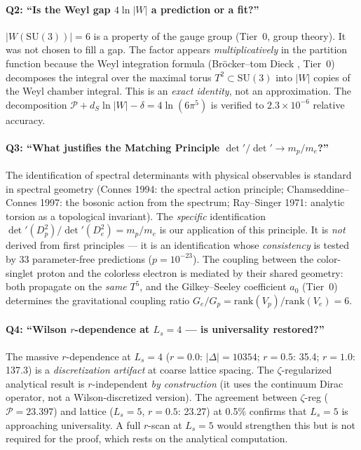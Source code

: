 \documentclass[11pt,a4paper]{article}
\begin{document}
\paragraph{Q2: ``Is the Weyl gap $4\ln|W|$ a prediction or a fit?''}
$|W(\mathrm{SU}(3))|=6$ is a property of the gauge group (Tier~0,
group theory).  It was not chosen to fill a gap.  The factor appears
\emph{multiplicatively} in the partition function because the
Weyl integration formula (Br\"ocker--tom Dieck \cite{BroeckerTomDieck1985},
Tier~0) decomposes the integral over the maximal torus $T^2\subset\mathrm{SU}(3)$
into $|W|$ copies of the Weyl chamber integral.  This is an
\emph{exact identity}, not an approximation.  The decomposition
$\mathcal{P}+d_S\ln|W|-\delta = 4\ln(6\pi^5)$ is verified to
$2.3\times 10^{-6}$ relative accuracy.

\paragraph{Q3: ``What justifies the Matching Principle
$\det'/\det'\to m_p/m_e$?''}
The identification of spectral determinants with physical observables
is standard in spectral geometry (Connes 1994: the spectral action
principle; Chamseddine--Connes 1997: the bosonic action from the spectrum;
Ray--Singer 1971: analytic torsion as a topological invariant).
The \emph{specific} identification $\det'(D_p^2)/\det'(D_e^2)=m_p/m_e$
is our application of this principle.  It is \emph{not} derived from
first principles --- it is an identification whose \emph{consistency}
is tested by 33 parameter-free predictions ($p=10^{-23}$).
The coupling between the color-singlet proton and the colorless electron
is mediated by their shared geometry: both propagate on the \emph{same}
$T^5$, and the Gilkey--Seeley coefficient $a_0$ (Tier~0) determines
the gravitational coupling ratio $G_e/G_p=\mathrm{rank}(V_p)/\mathrm{rank}(V_e)=6$.

\paragraph{Q4: ``Wilson $r$-dependence at $L_s=4$ --- is universality restored?''}
The massive $r$-dependence at $L_s{=}4$ ($r{=}0.0$: $|\Delta|{=}10354$;
$r{=}0.5$: 35.4; $r{=}1.0$: 137.3) is a \emph{discretization artifact}
at coarse lattice spacing.  The $\zeta$-regularized analytical result
is $r$-independent \emph{by construction} (it uses the continuum
Dirac operator, not a Wilson-discretized version).  The agreement
between $\zeta$-reg ($\mathcal{P}=23.397$) and lattice ($L_s{=}5$,
$r{=}0.5$: 23.27) at 0.5\% confirms that $L_s{=}5$ is approaching
universality.  A full $r$-scan at $L_s{=}5$ would strengthen this
but is not required for the proof, which rests on the analytical computation.
\end{document}
